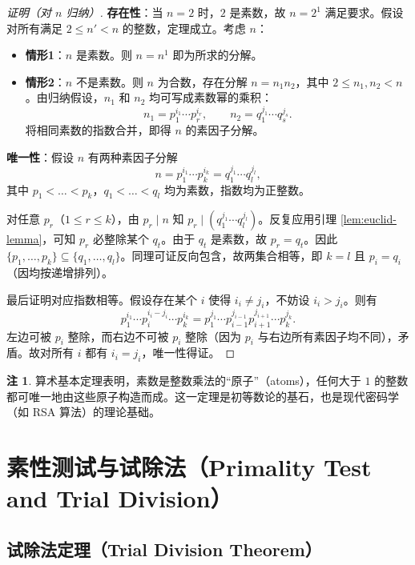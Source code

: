 \documentclass[UTF8,11pt,a4paper]{ctexbook}   %
\theoremstyle{definition}
\newtheorem{remark}{注}[section]
\begin{document}
\begin{proof}[证明（对 $n$ 归纳）]

\textbf{存在性}：当 $n=2$ 时，$2$ 是素数，故 $n=2^1$ 满足要求。假设对所有满足 $2\le n'<n$ 的整数，定理成立。考虑 $n$：

\begin{itemize}
    \item \textbf{情形1}：$n$ 是素数。则 $n=n^1$ 即为所求的分解。
    \item \textbf{情形2}：$n$ 不是素数。则 $n$ 为合数，存在分解 $n=n_1n_2$，其中 $2\le n_1,n_2<n$。由归纳假设，$n_1$ 和 $n_2$ 均可写成素数幂的乘积：
    \[
    n_1=p_1^{i_1}\cdots p_r^{i_r},\qquad n_2=q_1^{j_1}\cdots q_s^{j_s}.
    \]
    将相同素数的指数合并，即得 $n$ 的素因子分解。
\end{itemize}

\textbf{唯一性}：假设 $n$ 有两种素因子分解
\[
n=p_1^{i_1}\cdots p_k^{i_k}=q_1^{j_1}\cdots q_l^{j_l},
\]
其中 $p_1<\dots<p_k$，$q_1<\dots<q_l$ 均为素数，指数均为正整数。

对任意 $p_r$（$1\le r\le k$），由 $p_r\mid n$ 知 $p_r\mid(q_1^{j_1}\cdots q_l^{j_l})$。反复应用引理 \ref{lem:euclid-lemma}，可知 $p_r$ 必整除某个 $q_t$。由于 $q_t$ 是素数，故 $p_r=q_t$。因此 $\{p_1,\dots,p_k\}\subseteq\{q_1,\dots,q_l\}$。同理可证反向包含，故两集合相等，即 $k=l$ 且 $p_i=q_i$（因均按递增排列）。

最后证明对应指数相等。假设存在某个 $i$ 使得 $i_i\neq j_i$，不妨设 $i_i>j_i$。则有
\[
p_1^{i_1}\cdots p_i^{i_i-j_i}\cdots p_k^{i_k}=p_1^{j_1}\cdots p_{i-1}^{j_{i-1}}p_{i+1}^{j_{i+1}}\cdots p_k^{j_k}.
\]
左边可被 $p_i$ 整除，而右边不可被 $p_i$ 整除（因为 $p_i$ 与右边所有素因子均不同），矛盾。故对所有 $i$ 都有 $i_i=j_i$，唯一性得证。
\end{proof}

\begin{remark}
算术基本定理表明，素数是整数乘法的``原子''（atoms），任何大于 $1$ 的整数都可唯一地由这些原子构造而成。这一定理是初等数论的基石，也是现代密码学（如 RSA 算法）的理论基础。
\end{remark}

\section{素性测试与试除法（Primality Test and Trial Division）}

\subsection{试除法定理（Trial Division Theorem）}
\end{document}
